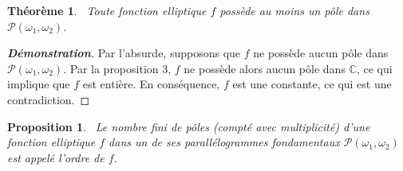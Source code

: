 \documentclass[12pt]{article}
\newtheorem{theorem}{Théorème}
\newtheorem{proposition}{Proposition}
\begin{document}
\begin{theorem} \
Toute fonction elliptique $f$ possède au moins un pôle dans $\mathcal{P}(\omega_1, \omega_2)$.
\end{theorem}
\begin{proof}[\textbf{Démonstration}]

Par l’absurde, supposons que $f$ ne possède aucun pôle dans $\mathcal{P}(\omega_1, \omega_2)$. Par la proposition 3, $f$ ne possède alors aucun pôle dans $\mathbb{C}$, ce qui implique que $f$ est entière. En conséquence, $f$ est une constante, ce qui est une contradiction.
\end{proof}
\begin{proposition} \
Le nombre fini de pôles (compté avec multiplicité) d’une fonction elliptique $f$ dans un de ses parallélogrammes fondamentaux $\mathcal{P}(\omega_1, \omega_2)$ est appelé l’ordre de $f$.
\end{proposition}
\end{document}
